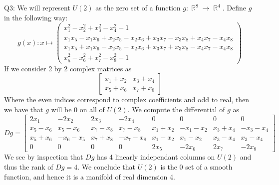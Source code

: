 \documentclass[letterpaper]{article}
\DeclareMathOperator{\R}{\mathbb{R}}
\begin{document}
\noindent Q3: We will represent $U(2)$ as the zero set of a function $g:\R^8 \to \R^4$. Define $g$ in the following way: $$g(x):x \mapsto \begin{pmatrix} x_1^2-x_2^2+x_3^2-x_4^2-1 \\  x_1x_5-x_1x_6+x_2x_5-x_2x_6+x_3x_7-x_3x_8+x_4x_7-x_4x_8 \\ x_1x_5+x_1x_6-x_2x_5-x_2x_6 + x_3x_7+x_3x_8-x_4x_7-x_4x_8 \\ x_5^2-x_6^2 + x_7^2 -x_8^2-1  \end{pmatrix} $$
If we consider 2 by 2 complex matrices as $$\begin{bmatrix}
    x_1+x_2 & x_3+x_4 \\ x_5+x_6 & x_7+x_8
\end{bmatrix}$$ Where the even indices correspond to complex coefficients and odd to real, then we have that $g$ will be 0 on all of $U(2)$. We compute the differential of $g$ as 
$$Dg = \begin{bmatrix} 2x_1 & -2x_2 & 2x_3 & -2x_4 & 0 & 0 & 0 & 0 
    \\ x_5-x_6 & x_5-x_6 & x_7-x_8 & x_7-x_8 & x_1+x_2 & -x_1-x_2 & x_3+x_4 & -x_3-x_4
    \\ x_5+x_6 & -x_6-x_5 & x_7+x_8 & -x_7-x_8 & x_1-x_2 & x_1-x_2 & x_3-x_4 & x_3-x_4
    \\ 0 & 0 & 0 & 0 & 2x_5 & -2x_6 & 2x_7 & -2x_8
\end{bmatrix}$$ We see by inspection that $Dg$ has 4 linearly independant columns on $U(2)$ and thus the rank of $Dg=4$. We conclude that $U(2)$ is the 0 set of a smooth function, and hence it is a manifold of real dimension 4. 
\end{document}
